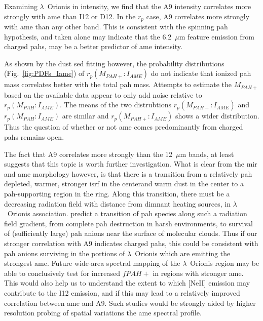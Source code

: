          Examining $\lambda$~Orionis in intensity, we find that the A9 intensity correlates more strongly with \gls{ame} than I12 or D12. In the $r_{p}$ case, A9 correlates more strongly with \gls{ame} than any other band. This is consistent with the spinning \gls{pah} hypothesis, and taken alone may indicate that the 6.2~$\mu$m feature emission from charged \gls{pah}s, may be a better predictor of \gls{ame} intensity.

          As shown by the dust \gls{sed} fitting however, the probability distributions (Fig.~\ref{fig:PDFs_Iame}) of $r_{p}(M_{PAH+}:I_{AME})$ do not indicate that ionized \gls{pah} mass correlates better with the total \gls{pah} mass. Attempts to estimate the $M_{PAH+}$ based on the available data appear to only add noise relative to $r_{p}(M_{PAH}:I_{AME})$. The means of the two distrubtions $r_{p}(M_{PAH+}:I_{AME})$  and $r_{p}(M_{PAH}:I_{AME})$ are similar and $r_{p}(M_{PAH+}:I_{AME})$ shows a wider distribution. Thus the question of whether or not \gls{ame} comes predominantly from charged \gls{pah}s remains open.

          The fact that A9 correlates more strongly than the 12~$\mu$m bands, at least suggests that this topic is worth further investigation. What is clear from the \gls{mir} and \gls{ame} morphology however, is that there is a transition from a relatively \gls{pah} depleted, warmer, stronger \gls{isrf} in the centerand warm dust in the center to a \gls{pah}-supporting region in the ring. Along this transition, there must be a decreasing radiation field with distance from dimnant heating sources, in $\lambda$~Orionis association. \cite{andrews16} predict a transition of \gls{pah} species along such a radiation field gradient, from complete \gls{pah} destruction in harsh environments, to survival of (sufficiently large) \gls{pah} anions near the surface of molecular clouds. Thus if our stronger correlation with A9 indicates charged \gls{pah}s, this could be consistent with \gls{pah} anions surviving in the portions of $\lambda$~Orionis which are emitting the strongest \gls{ame}. Future wide-area spectral mapping of the ${\lambda}$~Orionis region may be able to conclusively test for increased $fPAH+$ in regions with stronger \gls{ame}. This would also help us to understand the extent to which [NeII] emission may contribute to the I12 emission, and if this may lead to a relatively improved correlation between \gls{ame} and A9. Such studies would be strongly aided by higher resolution probing of spatial variations the \gls{ame} spectral profile.
